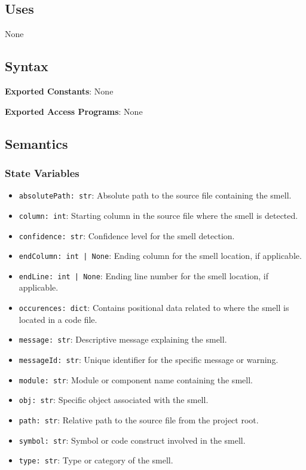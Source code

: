 \documentclass[12pt, titlepage]{article}
\begin{document}
\subsection{Uses}
None

\subsection{Syntax}
\noindent
\textbf{Exported Constants}: None

\noindent
\textbf{Exported Access Programs}: None

\subsection{Semantics}

\subsubsection{State Variables}
\begin{itemize}
  \item \texttt{absolutePath: str}: Absolute path to the source file containing the smell.
  \item \texttt{column: int}: Starting column in the source file where the smell is detected.
  \item \texttt{confidence: str}: Confidence level for the smell detection.
  \item \texttt{endColumn: int | None}: Ending column for the smell location, if applicable.
  \item \texttt{endLine: int | None}: Ending line number for the smell location, if applicable.
  \item \texttt{occurences: dict}: Contains positional data related to where the smell is located in a code file.
  \item \texttt{message: str}: Descriptive message explaining the smell.
  \item \texttt{messageId: str}: Unique identifier for the specific message or warning.
  \item \texttt{module: str}: Module or component name containing the smell.
  \item \texttt{obj: str}: Specific object associated with the smell.
  \item \texttt{path: str}: Relative path to the source file from the project root.
  \item \texttt{symbol: str}: Symbol or code construct involved in the smell.
  \item \texttt{type: str}: Type or category of the smell.
\end{itemize}
\end{document}
